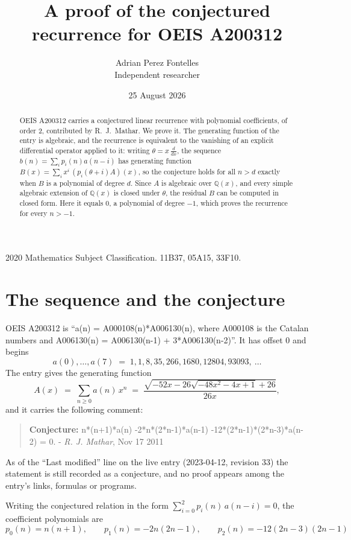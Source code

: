 \documentclass[11pt,a4paper]{article}
\title{A proof of the conjectured recurrence for OEIS A200312}
\author{Adrian Perez Fontelles\\ \small Independent researcher}
\date{25 August 2026}
\theoremstyle{plain}
\theoremstyle{definition}
\begin{document}
\maketitle

\begin{abstract}
OEIS A200312 carries a conjectured linear recurrence with polynomial coefficients, of
order 2, contributed by R.~J.~Mathar. We prove it. The generating function of the
entry is algebraic, and the recurrence is equivalent to the vanishing of an explicit
differential operator applied to it: writing $\theta=x\,\frac{d}{dx}$, the sequence
$b(n)=\sum_{i}p_{i}(n)a(n-i)$ has generating function
$B(x)=\sum_{i}x^{i}\,(p_{i}(\theta+i)A)(x)$, so the conjecture holds for all $n>d$ exactly
when $B$ is a polynomial of degree $d$. Since $A$ is algebraic over $\mathbb{Q}(x)$, and every simple
algebraic extension of $\mathbb{Q}(x)$ is closed under $\theta$, the residual $B$ can be
computed in closed form. Here it equals $0$, a polynomial of degree $-1$, which proves
the recurrence for every $n>-1$.
\end{abstract}

\noindent\small 2020 Mathematics Subject Classification. 11B37, 05A15, 33F10.\normalsize

\section{The sequence and the conjecture}

OEIS A200312 is ``a(n) = A000108(n)*A006130(n), where A000108 is the Catalan numbers and A006130(n) = A006130(n-1) + 3*A006130(n-2)''. It has offset $0$ and begins
\[
a(0),\dots,a(7)\;=\;1, 1, 8, 35, 266, 1680, 12804, 93093,\ \dots
\]
The entry gives the generating function
\begin{equation}\label{eq:gf}
A(x)\;=\;\sum_{n\ge 0} a(n)\,x^{n}\;=\;\frac{\sqrt{- 52 x - 26 \sqrt{- 48 x^{2} - 4 x + 1} + 26}}{26 x} ,
\end{equation}
and it carries the following comment:
\begin{quote}\small
\textbf{Conjecture:} n*(n+1)*a(n) -2*n*(2*n-1)*a(n-1) -12*(2*n-1)*(2*n-3)*a(n-2) = 0. - \emph{R. J. Mathar}, Nov 17 2011
\end{quote}
As of the ``Last modified'' line on the live entry (2023-04-12, revision 33) the
statement is still recorded as a conjecture, and no proof appears among the entry's links,
formulas or programs.

Writing the conjectured relation in the form $\sum_{i=0}^{2}p_{i}(n)\,a(n-i)=0$,
the coefficient polynomials are
\[
p_{0}(n)=n \left(n + 1\right),\qquad p_{1}(n)=- 2 n \left(2 n - 1\right),\qquad p_{2}(n)=- 12 \left(2 n - 3\right) \left(2 n - 1\right)
\]
\end{document}
